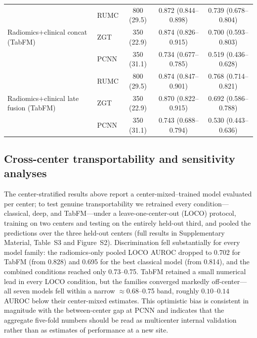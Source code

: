 \documentclass[11pt]{article}
\begin{document}
\begin{table}[!htbp]
{\begin{tabular}{llccc}
\midrule
\multirow{3}{*}{Radiomics$+$clinical concat (TabFM)}
 & RUMC & 800 (29.5)  & 0.872 (0.844--0.898) & 0.739 (0.678--0.804) \\
 & ZGT  & 350 (22.9)  & 0.874 (0.826--0.915) & 0.700 (0.593--0.803) \\
 & PCNN & 350 (31.1)  & 0.734 (0.677--0.785) & 0.519 (0.436--0.628) \\
\midrule
\multirow{3}{*}{Radiomics$+$clinical late fusion (TabFM)}
 & RUMC & 800 (29.5)  & 0.874 (0.847--0.901) & 0.768 (0.714--0.821) \\
 & ZGT  & 350 (22.9)  & 0.870 (0.822--0.915) & 0.692 (0.586--0.788) \\
 & PCNN & 350 (31.1)  & 0.743 (0.688--0.794) & 0.530 (0.443--0.636) \\
\bottomrule
\end{tabular}
}
\end{table}

\subsection{Cross-center transportability and sensitivity analyses}
\label{sec:res-transport}

The center-stratified results above report a center-mixed--trained model evaluated
per center; to test genuine transportability we retrained every condition---classical,
deep, and TabFM---under a leave-one-center-out (LOCO) protocol, training on two centers
and testing on the entirely held-out third, and pooled the predictions over the three
held-out centers (full results in Supplementary Material, Table~S3 and Figure~S2).
Discrimination fell substantially for every model family: the radiomics-only pooled
LOCO AUROC dropped to 0.702 for TabFM (from 0.828) and 0.695 for the best classical
model (from 0.814), and the combined conditions reached only 0.73--0.75. TabFM retained
a small numerical lead in every LOCO condition, but the families converged markedly
off-center---all seven models fell within a narrow $\approx$0.68--0.75 band, roughly
$0.10$--$0.14$ AUROC below their center-mixed estimates. This optimistic bias is
consistent in magnitude with the between-center gap at PCNN and indicates that the
aggregate five-fold numbers should be read as multicenter internal validation rather
than as estimates of performance at a new site.
\end{document}
